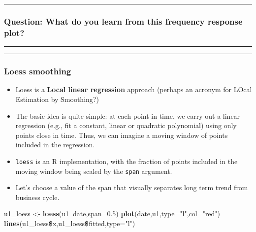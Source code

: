 \documentclass[]{article}
\newenvironment{Shaded}{\begin{snugshade}}{\end{snugshade}}
\newcommand{\KeywordTok}[1]{\textcolor[rgb]{0.13,0.29,0.53}{\textbf{#1}}}
\newcommand{\DataTypeTok}[1]{\textcolor[rgb]{0.13,0.29,0.53}{#1}}
\newcommand{\FloatTok}[1]{\textcolor[rgb]{0.00,0.00,0.81}{#1}}
\newcommand{\StringTok}[1]{\textcolor[rgb]{0.31,0.60,0.02}{#1}}
\newcommand{\OperatorTok}[1]{\textcolor[rgb]{0.81,0.36,0.00}{\textbf{#1}}}
\newcommand{\NormalTok}[1]{#1}
\begin{document}
\begin{center}\rule{0.5\linewidth}{\linethickness}\end{center}

\subsubsection{Question: What do you learn from this frequency response
plot?}\label{question-what-do-you-learn-from-this-frequency-response-plot}

\begin{center}\rule{0.5\linewidth}{\linethickness}\end{center}

\begin{center}\rule{0.5\linewidth}{\linethickness}\end{center}

\subsubsection{Loess smoothing}\label{loess-smoothing}

\begin{itemize}
\item
  Loess is a \textbf{Local linear regression} approach (perhaps an
  acronym for LOcal Estimation by Smoothing?)
\item
  The basic idea is quite simple: at each point in time, we carry out a
  linear regression (e.g., fit a constant, linear or quadratic
  polynomial) using only points close in time. Thus, we can imagine a
  moving window of points included in the regression.
\item
  \texttt{loess} is an R implementation, with the fraction of points
  included in the moving window being scaled by the \texttt{span}
  argument.
\item
  Let's choose a value of the span that visually separates long term
  trend from business cycle.
\end{itemize}

\begin{Shaded}
\begin{Highlighting}[]
\NormalTok{u1_loess <-}\StringTok{ }\KeywordTok{loess}\NormalTok{(u1}\OperatorTok{~}\NormalTok{date,}\DataTypeTok{span=}\FloatTok{0.5}\NormalTok{)}
\KeywordTok{plot}\NormalTok{(date,u1,}\DataTypeTok{type=}\StringTok{"l"}\NormalTok{,}\DataTypeTok{col=}\StringTok{"red"}\NormalTok{)}
\KeywordTok{lines}\NormalTok{(u1_loess}\OperatorTok{\$}\NormalTok{x,u1_loess}\OperatorTok{\$}\NormalTok{fitted,}\DataTypeTok{type=}\StringTok{"l"}\NormalTok{)}
\end{Highlighting}
\end{Shaded}
\end{document}

